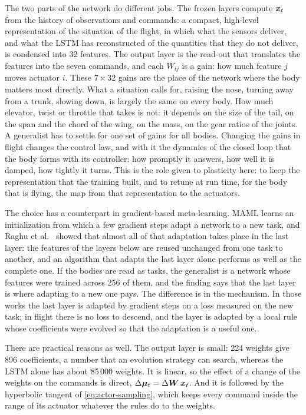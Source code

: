 The two parts of the network do different jobs. The frozen layers compute $\bm{x}_t$ from the history of observations and commands: a compact, high-level representation of the situation of the flight, in which what the sensors deliver, and what the LSTM has reconstructed of the quantities that they do not deliver, is condensed into 32 features. The output layer is the read-out that translates the features into the seven commands, and each $W_{ij}$ is a gain: how much feature $j$ moves actuator $i$. These $7 \times 32$ gains are the place of the network where the body matters most directly. What a situation calls for, raising the nose, turning away from a trunk, slowing down, is largely the same on every body. How much elevator, twist or throttle that takes is not: it depends on the size of the tail, on the span and the chord of the wing, on the mass, on the gear ratios of the joints. A generalist has to settle for one set of gains for all bodies. Changing the gains in flight changes the control law, and with it the dynamics of the closed loop that the body forms with its controller: how promptly it answers, how well it is damped, how tightly it turns. This is the role given to plasticity here: to keep the representation that the training built, and to retune at run time, for the body that is flying, the map from that representation to the actuators.

The choice has a counterpart in gradient-based meta-learning. MAML \cite{finn2017maml} learns an initialization from which a few gradient steps adapt a network to a new task, and Raghu et al.\ \cite{raghu2020rapid} showed that almost all of that adaptation takes place in the last layer: the features of the layers below are reused unchanged from one task to another, and an algorithm that adapts the last layer alone performs as well as the complete one. If the bodies are read as tasks, the generalist is a network whose features were trained across 256 of them, and the finding says that the last layer is where adapting to a new one pays. The difference is in the mechanism. In those works the last layer is adapted by gradient steps on a loss measured on the new task; in flight there is no loss to descend, and the layer is adapted by a local rule whose coefficients were evolved so that the adaptation is a useful one.

There are practical reasons as well. The output layer is small: 224 weights give 896 coefficients, a number that an evolution strategy can search, whereas the LSTM alone has about 85\,000 weights. It is linear, so the effect of a change of the weights on the commands is direct, $\Delta \bm{\mu}_t = \Delta \bm{W}\, \bm{x}_t$. And it is followed by the hyperbolic tangent of \eqref{eq:actor-sampling}, which keeps every command inside the range of its actuator whatever the rules do to the weights.

